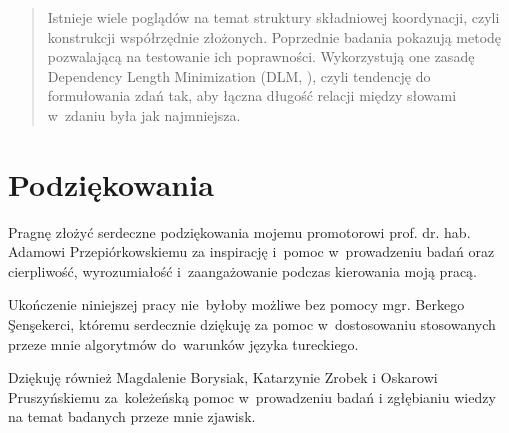 \maketitle


    \begin{abstract}
        {Istnieje wiele poglądów na temat struktury składniowej koordynacji, czyli konstrukcji współrzędnie złożonych. Poprzednie badania \citep{przepiorkowski2023conjunct} pokazują metodę pozwalającą na testowanie ich poprawności. Wykorzystują one zasadę Dependency Length Minimization (DLM, \citealt{temperley2007minimization}), czyli tendencję do formułowania zdań tak, aby łączna długość relacji między słowami w~zdaniu była jak najmniejsza. 

}
    \end{abstract}

    \thispagestyle{empty}
    \setcounter{page}{3}

\chapter*{Podziękowania}

Pragnę złożyć serdeczne podziękowania mojemu promotorowi prof. dr. hab. Adamowi Przepiórkowskiemu za inspirację i~pomoc w~prowadzeniu badań oraz cierpliwość, wyrozumiałość i~zaangażowanie podczas kierowania moją pracą.

Ukończenie niniejszej pracy nie~byłoby możliwe bez pomocy mgr. Berkego \c{S}en\c{s}ekerci, któremu serdecznie dziękuję za pomoc w~dostosowaniu stosowanych przeze mnie algorytmów do~warunków języka tureckiego.

Dziękuję również Magdalenie Borysiak, Katarzynie Zrobek i Oskarowi Pruszyńskiemu za~koleżeńską pomoc w~prowadzeniu badań i zgłębianiu wiedzy na temat badanych przeze mnie zjawisk.
    
    \tableofcontents